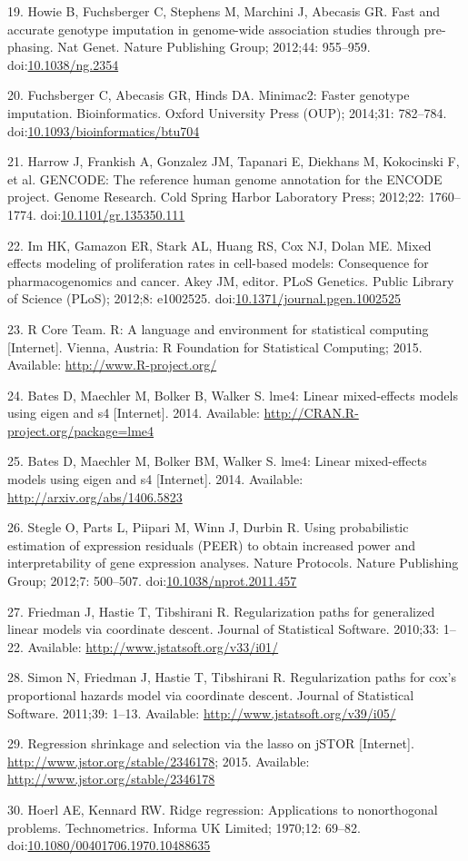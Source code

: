 \documentclass[]{article}
\begin{document}
19. Howie B, Fuchsberger C, Stephens M, Marchini J, Abecasis GR. Fast
and accurate genotype imputation in genome-wide association studies
through pre-phasing. Nat Genet. Nature Publishing Group; 2012;44:
955--959. doi:\href{http://dx.doi.org/10.1038/ng.2354}{10.1038/ng.2354}

20. Fuchsberger C, Abecasis GR, Hinds DA. Minimac2: Faster genotype
imputation. Bioinformatics. Oxford University Press (OUP); 2014;31:
782--784.
doi:\href{http://dx.doi.org/10.1093/bioinformatics/btu704}{10.1093/bioinformatics/btu704}

21. Harrow J, Frankish A, Gonzalez JM, Tapanari E, Diekhans M,
Kokocinski F, et al. GENCODE: The reference human genome annotation for
the ENCODE project. Genome Research. Cold Spring Harbor Laboratory
Press; 2012;22: 1760--1774.
doi:\href{http://dx.doi.org/10.1101/gr.135350.111}{10.1101/gr.135350.111}

22. Im HK, Gamazon ER, Stark AL, Huang RS, Cox NJ, Dolan ME. Mixed
effects modeling of proliferation rates in cell-based models:
Consequence for pharmacogenomics and cancer. Akey JM, editor. PLoS
Genetics. Public Library of Science (PLoS); 2012;8: e1002525.
doi:\href{http://dx.doi.org/10.1371/journal.pgen.1002525}{10.1371/journal.pgen.1002525}

23. R Core Team. R: A language and environment for statistical computing
{[}Internet{]}. Vienna, Austria: R Foundation for Statistical Computing;
2015. Available: \url{http://www.R-project.org/}

24. Bates D, Maechler M, Bolker B, Walker S. lme4: Linear mixed-effects
models using eigen and s4 {[}Internet{]}. 2014. Available:
\url{http://CRAN.R-project.org/package=lme4}

25. Bates D, Maechler M, Bolker BM, Walker S. lme4: Linear mixed-effects
models using eigen and s4 {[}Internet{]}. 2014. Available:
\url{http://arxiv.org/abs/1406.5823}

26. Stegle O, Parts L, Piipari M, Winn J, Durbin R. Using probabilistic
estimation of expression residuals (PEER) to obtain increased power and
interpretability of gene expression analyses. Nature Protocols. Nature
Publishing Group; 2012;7: 500--507.
doi:\href{http://dx.doi.org/10.1038/nprot.2011.457}{10.1038/nprot.2011.457}

27. Friedman J, Hastie T, Tibshirani R. Regularization paths for
generalized linear models via coordinate descent. Journal of Statistical
Software. 2010;33: 1--22. Available:
\url{http://www.jstatsoft.org/v33/i01/}

28. Simon N, Friedman J, Hastie T, Tibshirani R. Regularization paths
for cox's proportional hazards model via coordinate descent. Journal of
Statistical Software. 2011;39: 1--13. Available:
\url{http://www.jstatsoft.org/v39/i05/}

29. Regression shrinkage and selection via the lasso on jSTOR
{[}Internet{]}. \url{http://www.jstor.org/stable/2346178}; 2015.
Available: \url{http://www.jstor.org/stable/2346178}

30. Hoerl AE, Kennard RW. Ridge regression: Applications to
nonorthogonal problems. Technometrics. Informa UK Limited; 1970;12:
69--82.
doi:\href{http://dx.doi.org/10.1080/00401706.1970.10488635}{10.1080/00401706.1970.10488635}
\end{document}
